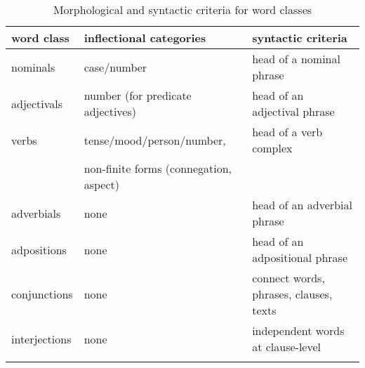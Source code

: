 \begin{table}\centering
\caption[Morphological and syntactic criteria for word classes]{Morphological and syntactic criteria for word classes}\label{wordClassSummary1}
\begin{tabular}[l]{l p{130pt} p{130pt}}\mytoprule
{word class}	&{inflectional categories}		&{syntactic criteria}		\\\hline
nominals		&case/number					&head of a nominal phrase	\\
adjectivals		&number (for predicate adjectives)	&head of an adjectival phrase	\\%
verbs		&tense/mood/person/number,		&head of a verb complex	\\%
			&non-finite forms (connegation, aspect)&					\\
adverbials		& none							&head of an adverbial phrase	\\
adpositions	& none							&head of an adpositional phrase	\\
conjunctions	& none							&connect words, phrases, clauses, texts	\\
interjections	& none							&independent words at clause-level	\\\mybottomrule
\end{tabular}

\end{table}
